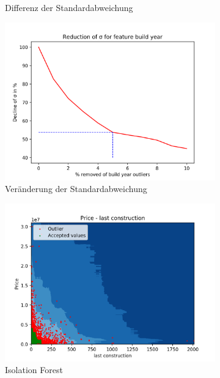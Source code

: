 \begin{figure}[H]
\begin{subfigure}{.5\textwidth}
  \caption{Differenz der Standardabweichung}
\end{subfigure}
\begin{subfigure}{.5\textwidth}
  \centering
  \includegraphics[width=\linewidth]{images/anhang/outlier_detection/build_year_std.png}
  \caption{Veränderung der Standardabweichung}
\end{subfigure}
\begin{subfigure}{.5\textwidth}
  \centering
  \includegraphics[width=\linewidth]{images/anhang/outlier_detection/last_construction_IsolationForest.png}
  \caption{Isolation Forest}
\end{subfigure}
\begin{subfigure}{.5\textwidth}
  \centering

\end{subfigure}
\end{figure}
